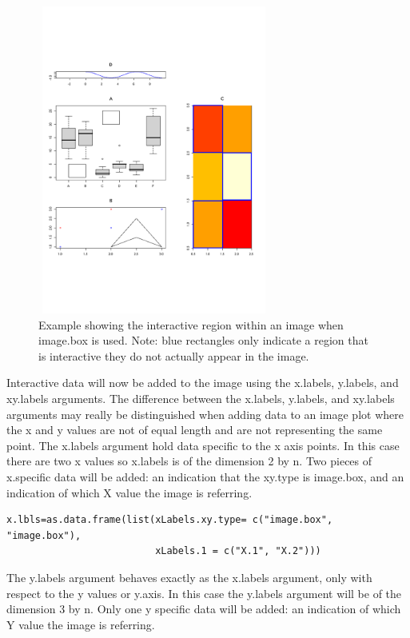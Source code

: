 \documentclass[]{article}
\begin{document}
\begin{center}
\begin{figure}
\includegraphics[width=3in, height=4in]{imageBoxEx}
\caption{Example showing the interactive region within an image when image.box is used. Note: blue rectangles only indicate a region that is interactive they do not actually appear in the image.}
\end{figure}
\end{center}

Interactive data will now be added to the image using the x.labels, y.labels, and xy.labels arguments. The difference between the x.labels, y.labels, and xy.labels arguments may really be distinguished when adding data to an image plot where the x and y values are not of equal length and are not representing the same point. The x.labels argument hold data specific to the x axis points. In this case there are two x values so x.labels is of the dimension 2 by n. Two pieces of x.specific data will be added: an indication that the xy.type is image.box, and an indication of which X value the image is referring. 



\begin{verbatim}
x.lbls=as.data.frame(list(xLabels.xy.type= c("image.box", "image.box"),
                          xLabels.1 = c("X.1", "X.2")))
\end{verbatim}

The y.labels argument behaves exactly as the x.labels argument, only with respect to the y values or y.axis. In this case the y.labels argument will be of the dimension 3 by n. Only one y specific data will be added: an indication of which Y value the image is referring. 
\end{document}
